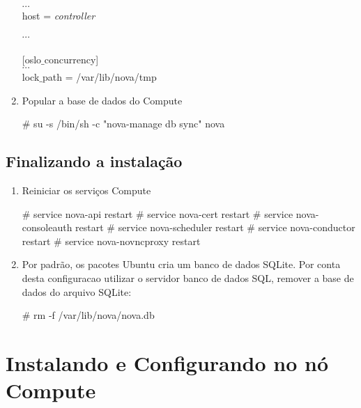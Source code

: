 \begin{enumerate}
\begin{snugshade}
		[glance]\\
		$\cdots$		\\
		host = \emph{controller} \\ \\
		$\cdots$ \\ \\		
		
		[oslo$\_$concurrency] \\
		$\cdots$\\
		lock$\_$path = /var/lib/nova/tmp
	\end{snugshade}
	
	\item Popular a base de dados do Compute
	\begin{snugshade}
		\# su -s /bin/sh -c "nova-manage db sync" nova
	\end{snugshade}
\end{enumerate}

\subsection{Finalizando a instalação}
\begin{enumerate}
	\item Reiniciar os serviços Compute
	\begin{snugshade}
		\# service nova-api restart
		\# service nova-cert restart
		\# service nova-consoleauth restart
		\# service nova-scheduler restart
		\# service nova-conductor restart
		\# service	nova-novncproxy restart
	\end{snugshade}
	
	\item Por padrão, os pacotes Ubuntu cria um banco de dados SQLite. 
	Por conta desta configuracao utilizar o servidor banco de dados SQL, remover a base de dados do arquivo SQLite:
	\begin{snugshade}
		\# rm -f /var/lib/nova/nova.db
	\end{snugshade}		
\end{enumerate}

\section{Instalando e Configurando no nó Compute}

